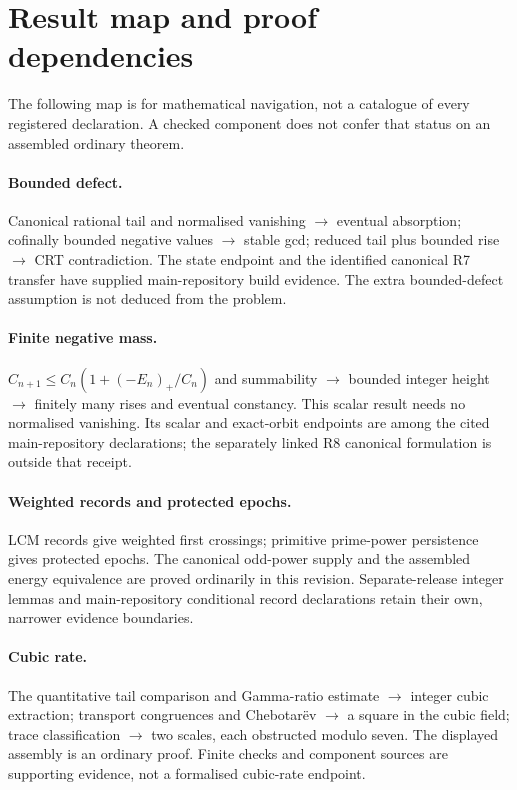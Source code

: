 \clearpage
\section{Result map and proof dependencies}\label{sec:erdos-243-complete-family-map}
The following map is for mathematical navigation, not a catalogue of every
registered declaration. A checked component does not confer that status on
an assembled ordinary theorem.

\paragraph{Bounded defect.}
Canonical rational tail and normalised vanishing
$\longrightarrow$ eventual absorption; cofinally bounded negative values
$\longrightarrow$ stable gcd; reduced tail plus bounded rise
$\longrightarrow$ CRT contradiction. The state endpoint and the identified
canonical R7 transfer have supplied main-repository build evidence.
The extra bounded-defect assumption is not deduced from the problem.

\paragraph{Finite negative mass.}
$C_{n+1}\le C_n(1+(-E_n)_+/C_n)$ and summability
$\longrightarrow$ bounded integer height
$\longrightarrow$ finitely many rises and eventual constancy.
This scalar result needs no normalised vanishing. Its scalar and exact-orbit
endpoints are among the cited main-repository declarations; the separately
linked R8 canonical formulation is outside that receipt.

\paragraph{Weighted records and protected epochs.}
LCM records give weighted first crossings; primitive prime-power persistence
gives protected epochs. The canonical odd-power supply and the assembled
energy equivalence are proved ordinarily in this revision. Separate-release
integer lemmas and main-repository conditional record declarations retain
their own, narrower evidence boundaries.

\paragraph{Cubic rate.}
The quantitative tail comparison and Gamma-ratio estimate
$\longrightarrow$ integer cubic extraction; transport congruences and
Chebotar\"ev
$\longrightarrow$ a square in the cubic field; trace classification
$\longrightarrow$ two scales, each obstructed modulo seven.
The displayed assembly is an ordinary proof. Finite checks and component
sources are supporting evidence, not a formalised cubic-rate endpoint.

